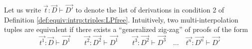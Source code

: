\documentclass[a4paper,UKenglish,cleveref,autoref,thm-restate, anonymous]{lipics-v2021}
\renewcommand{\vec}[1]{\overrightarrow{#1}}
\newcommand{\mf}[1]{\mathsf{#1}}
\newcommand{\GD}{\Delta}
\newcommand{\vd}{\vdash}
\newcommand{\cuts}{\mf{cut}^*}
\begin{document}

 Let us write $\vec{t} : \vec{D} \vdash \vec{D'}$ to denote the list of derivations in condition 2 of Definition \ref{def:equiv:intrp:triples:LPfree}.
 Intuitively, two multi-interpolation tuples are equivalent if there exists a ``generalized zig-zag'' of proofs of the form
 $$
 \vec{t^1}: \vec{D} \vdash \vec{D^1} \qquad
 \vec{t^2}: \vec{D^2} \vdash \vec{D^1} \qquad
 \vec{t^3} : \vec{D^2} \vdash \vec{D^3}
 \quad
 \dots
 \quad
 \vec{t^n} : \vec{D^n} \vdash \vec{D'}
 $$
\end{document}
